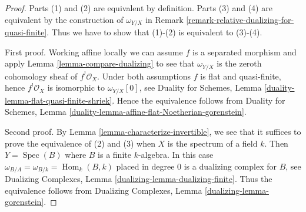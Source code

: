 \documentclass[10pt,a4paper]{amsart}
\theoremstyle{plain}
\theoremstyle{definition}
\theoremstyle{remark}
\numberwithin{equation}{subsection}
\def\Spec{\mathop{\mathrm{Spec}}}
\def\Hom{\mathop{\mathrm{Hom}}\nolimits}
\begin{document}
\begin{proof}
Parts (1) and (2) are equivalent by definition. Parts (3) and (4)
are equivalent by the construction of $\omega_{Y/X}$ in
Remark \ref{remark-relative-dualizing-for-quasi-finite}.
Thus we have to show that (1)-(2) is equivalent to (3)-(4).

\medskip\noindent
First proof. Working affine locally we can assume $f$ is a separated
morphism and apply Lemma \ref{lemma-compare-dualizing} to see that
$\omega_{Y/X}$ is the zeroth cohomology sheaf of $f^!\mathcal{O}_X$.
Under both assumptions $f$ is flat and quasi-finite, hence
$f^!\mathcal{O}_X$ is isomorphic to $\omega_{Y/X}[0]$, see
Duality for Schemes, Lemma \ref{duality-lemma-flat-quasi-finite-shriek}. Hence
the equivalence follows from
Duality for Schemes, Lemma
\ref{duality-lemma-affine-flat-Noetherian-gorenstein}.

\medskip\noindent
Second proof. By Lemma \ref{lemma-characterize-invertible},
we see that it suffices to prove the equivalence of
(2) and (3) when $X$ is the spectrum of a field $k$.
Then $Y = \Spec(B)$ where $B$ is a finite $k$-algebra.
In this case $\omega_{B/A} = \omega_{B/k} = \Hom_k(B, k)$
placed in degree $0$ is a dualizing complex for $B$, see
Dualizing Complexes, Lemma \ref{dualizing-lemma-dualizing-finite}.
Thus the equivalence follows from
Dualizing Complexes, Lemma \ref{dualizing-lemma-gorenstein}.
\end{proof}
\end{document}
